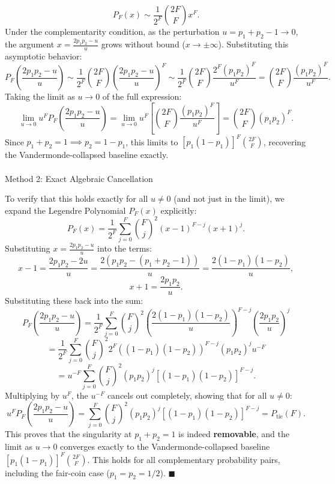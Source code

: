 \documentclass[
  letterpaper,
  DIV=11,
  numbers=noendperiod]{scrartcl}
\makeatletter
\let\oldparagraph\paragraph
\renewcommand{\paragraph}{
    \@ifstar
      \xxxParagraphStar
      \xxxParagraphNoStar
  }
\newcommand{\xxxParagraphStar}[1]{\oldparagraph*{#1}\mbox{}}
\newcommand{\xxxParagraphNoStar}[1]{\oldparagraph{#1}\mbox{}}
\makeatother
\begin{document}
\[
P_F(x) \sim \frac{1}{2^F} \binom{2F}{F} x^F.
\] Under the complementarity condition, as the perturbation
\(u = p_1+p_2-1 \to 0\), the argument \(x = \frac{2p_1p_2 - u}{u}\)
grows without bound (\(x \to \pm\infty\)). Substituting this asymptotic
behavior: \[
P_F\left( \frac{2p_1p_2 - u}{u} \right) \sim \frac{1}{2^F} \binom{2F}{F} \left( \frac{2p_1p_2 - u}{u} \right)^F \sim \frac{1}{2^F} \binom{2F}{F} \frac{2^F (p_1 p_2)^F}{u^F} = \binom{2F}{F} \frac{(p_1 p_2)^F}{u^F}.
\] Taking the limit as \(u \to 0\) of the full expression: \[
\lim_{u \to 0} u^F P_F\left( \frac{2p_1p_2 - u}{u} \right) = \lim_{u \to 0} u^F \left[ \binom{2F}{F} \frac{(p_1 p_2)^F}{u^F} \right] = \binom{2F}{F} (p_1 p_2)^F.
\] Since \(p_1 + p_2 = 1 \implies p_2 = 1 - p_1\), this limits to
\([p_1(1-p_1)]^F \binom{2F}{F}\), recovering the Vandermonde-collapsed
baseline exactly.

\paragraph{Method 2: Exact Algebraic
Cancellation}\label{method-2-exact-algebraic-cancellation}

To verify that this holds exactly for all \(u \neq 0\) (and not just in
the limit), we expand the Legendre Polynomial \(P_F(x)\) explicitly: \[
P_F(x) = \frac{1}{2^F} \sum_{j=0}^{F} \binom{F}{j}^2 (x-1)^{F-j} (x+1)^j.
\] Substituting \(x = \frac{2p_1p_2 - u}{u}\) into the terms: \[
x - 1 = \frac{2p_1p_2 - 2u}{u} = \frac{2(p_1p_2 - (p_1+p_2-1))}{u} = \frac{2(1-p_1)(1-p_2)}{u},
\] \[
x + 1 = \frac{2p_1p_2}{u}.
\] Substituting these back into the sum: \[
P_F\left( \frac{2p_1p_2 - u}{u} \right) = \frac{1}{2^F} \sum_{j=0}^{F} \binom{F}{j}^2 \left( \frac{2(1-p_1)(1-p_2)}{u} \right)^{F-j} \left( \frac{2p_1p_2}{u} \right)^j
\] \[
= \frac{1}{2^F} \sum_{j=0}^{F} \binom{F}{j}^2 2^F \left( (1-p_1)(1-p_2) \right)^{F-j} (p_1p_2)^j u^{-F}
\] \[
= u^{-F} \sum_{j=0}^{F} \binom{F}{j}^2 (p_1p_2)^j \left[ (1-p_1)(1-p_2) \right]^{F-j}.
\] Multiplying by \(u^F\), the \(u^{-F}\) cancels out completely,
showing that for all \(u \neq 0\): \[
u^F P_F\left( \frac{2p_1p_2 - u}{u} \right) = \sum_{j=0}^{F} \binom{F}{j}^2 (p_1p_2)^j \left[ (1-p_1)(1-p_2) \right]^{F-j} = P_{\text{tie}}(F).
\] This proves that the singularity at \(p_1 + p_2 = 1\) is indeed
\textbf{removable}, and the limit as \(u \to 0\) converges exactly to
the Vandermonde-collapsed baseline \([p_1(1-p_1)]^F \binom{2F}{F}\).
This holds for all complementary probability pairs, including the
fair-coin case (\(p_1=p_2=1/2\)). \(\blacksquare\)
\end{document}
